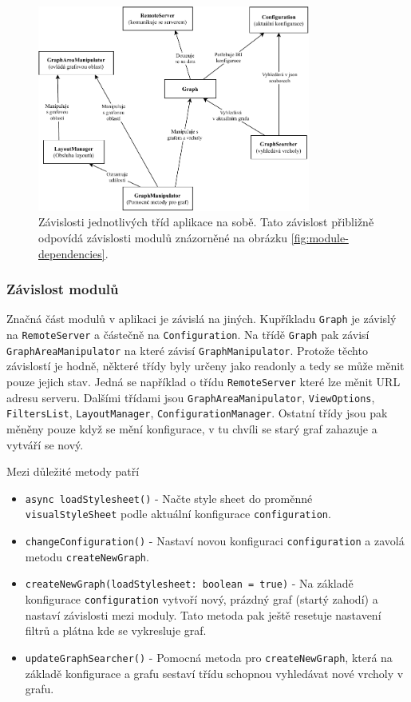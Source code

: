 \begin{figure}[h]
    \centering
    \includegraphics[width=0.8\textwidth]{media/dependencies.pdf}
    \caption{Závislosti jednotlivých tříd aplikace na sobě. Tato závislost přibližně odpovídá závislosti modulů znázorněné na obrázku \ref{fig:module-dependencies}.}

\end{figure}

\subsubsection{Závislost modulů}

Značná část modulů v aplikaci je závislá na jiných. Kupříkladu \texttt{Graph} je závislý na \texttt{RemoteServer} a částečně na \texttt{Configuration}. Na třídě \texttt{Graph} pak závisí \texttt{GraphAreaManipulator} na které závisí \texttt{GraphManipulator}. Protože těchto závislostí je hodně, některé třídy byly určeny jako readonly a tedy se může měnit pouze jejich stav. Jedná se například o třídu \texttt{RemoteServer} které lze měnit URL adresu serveru. Dalšími třídami jsou \texttt{GraphAreaManipulator}, \texttt{ViewOptions}, \texttt{FiltersList}, \texttt{LayoutManager}, \texttt{ConfigurationManager}. Ostatní třídy jsou pak měněny pouze když se mění konfigurace, v tu chvíli se starý graf zahazuje a vytváří se nový.

\medskip

Mezi důležité metody patří
\begin{itemize}
  \item \texttt{async loadStylesheet()} - Načte style sheet do proměnné \\ \texttt{visualStyleSheet} podle aktuální konfigurace \texttt{configuration}.
  \item \texttt{changeConfiguration()} - Nastaví novou konfiguraci \texttt{configuration} a zavolá metodu \texttt{createNewGraph}.
  \item \texttt{createNewGraph(loadStylesheet: boolean = true)} - Na základě konfigurace \texttt{configuration} vytvoří nový, prázdný graf (startý zahodí) a nastaví závislosti mezi moduly. Tato metoda pak ještě resetuje nastavení filtrů a plátna kde se vykresluje graf.
  \item \texttt{updateGraphSearcher()} - Pomocná metoda pro \texttt{createNewGraph}, která na základě konfigurace a grafu sestaví třídu schopnou vyhledávat nové vrcholy v grafu.
\end{itemize}

